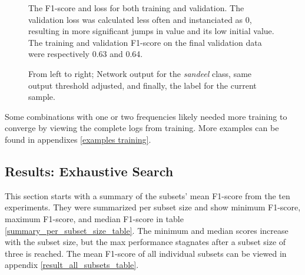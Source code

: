         \begin{figure}[H]
            \centering
            \qquad
            \caption[Loss and F1 score during training]{The F1-score and loss for both training and validation. The validation loss was calculated less often and instanciated as 0, resulting in more significant jumps in value and its low initial value. The training and validation F1-score on the final validation data were respectively 0.63 and 0.64.}%
            \label{loss_f1_duo_plot_fig}%
        \end{figure}
        \begin{figure}[H]
            \centering
            
            \caption[Example output, threshold and label]{From left to right; Network output for the \textit{sandeel} class, same output threshold adjusted, and finally, the label for the current sample.}
          	\medskip 
            \label{sandeel_threshold_label}
        \end{figure}
    
    
     Some combinations with one or two frequencies likely needed more training to converge by viewing the complete logs from training. More examples can be found in appendixes \ref{examples training}.
    

\subsection{Results: Exhaustive Search}
    This section starts with a summary of the subsets' mean F1-score from the ten experiments. They were summarized per subset size and show minimum F1-score, maximum F1-score, and median F1-score in table \ref{summary_per_subset_size_table}. The minimum and median scores increase with the subset size, but the max performance stagnates after a subset size of three is reached. The mean F1-score of all individual subsets can be viewed in appendix \ref{result_all_subsets_table}. 


